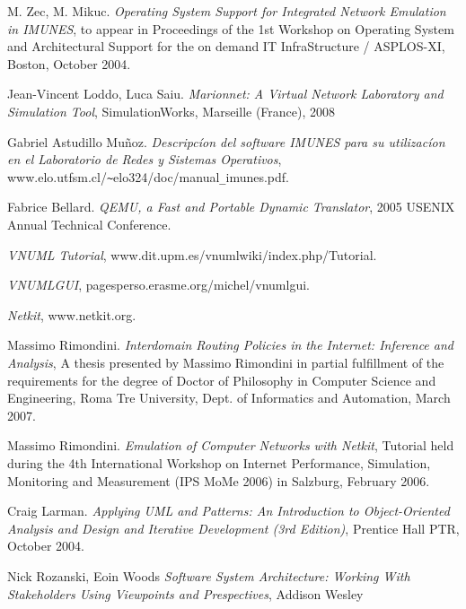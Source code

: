 \clearpage
\begin{thebibliography}{9}
	M. Zec, M. Mikuc.
	\emph{Operating System Support for Integrated Network Emulation in IMUNES}, to appear in Proceedings of the 1st Workshop on Operating System and Architectural Support for the on demand IT InfraStructure / ASPLOS-XI, Boston, October 2004.

	Jean-Vincent Loddo, Luca Saiu.
	\emph{Marionnet: A Virtual Network Laboratory and Simulation Tool}, SimulationWorks, Marseille (France), 2008

	Gabriel Astudillo Mu\~{n}oz.
	\emph{Descripcíon del software IMUNES para su utilizacíon en el Laboratorio de Redes y Sistemas Operativos}, www.elo.utfsm.cl/\verb+~+elo324/doc/manual\verb+_+imunes.pdf.

	Fabrice Bellard.
	\emph{QEMU, a Fast and Portable Dynamic Translator}, 2005 USENIX Annual Technical Conference.

	\emph{VNUML Tutorial}, www.dit.upm.es/vnumlwiki/index.php/Tutorial.

	\emph{VNUMLGUI}, pagesperso.erasme.org/michel/vnumlgui.

	\emph{Netkit}, www.netkit.org.

	Massimo Rimondini.
	\emph{Interdomain Routing Policies in the Internet: Inference and Analysis}, A thesis presented by Massimo Rimondini in partial fulfillment of the requirements for the degree of Doctor of Philosophy in Computer Science and Engineering, Roma Tre University, Dept. of Informatics and Automation, March 2007.

	Massimo Rimondini.
	\emph{Emulation of Computer Networks with Netkit}, Tutorial held during the 4th International Workshop on Internet Performance, Simulation, Monitoring and Measurement (IPS MoMe 2006) in Salzburg, February 2006.

	Craig Larman.
	\emph{Applying UML and Patterns: An Introduction to Object-Oriented Analysis and Design and Iterative Development (3rd Edition)}, Prentice Hall PTR, October 2004.

	Nick Rozanski, Eoin Woods
	\emph{Software System Architecture: Working With Stakeholders Using Viewpoints and Prespectives}, Addison Wesley

\end{thebibliography}
